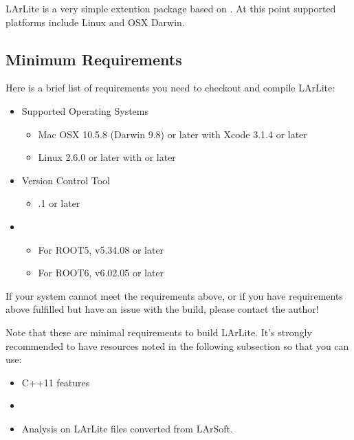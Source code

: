 LArLite is a very simple \CPP extention package based on \ROOT. 
At this point supported platforms include Linux and OSX Darwin. 

\subsection{Minimum Requirements}
Here is a brief list of requirements you need to checkout and compile LArLite:
\begin{itemize}
\item Supported Operating Systems
    \begin{itemize}
    \item Mac OSX 10.5.8 (Darwin 9.8) or later with Xcode 3.1.4 or later
    \item Linux 2.6.0 or later with  or later
    \end{itemize}
\item Version Control Tool
    \begin{itemize}
    \item {}.1 or later
    \end{itemize}
\item \ROOT
    \begin{itemize}
    \item For ROOT5, v5.34.08 or later
    \item For ROOT6, v6.02.05 or later
    \end{itemize}
\end{itemize}

If your system cannot meet the requirements above, or if you have requirements above fulfilled but have an issue with the build, please contact the author!

Note that these are minimal requirements to build LArLite. It's strongly recommended to have resources noted in the following subsection so that you can use:
\begin{itemize}
    \item {\ttfamily C++11} features
    \item \PyROOT
    \item Analysis on LArLite files converted from LArSoft.
\end{itemize}


